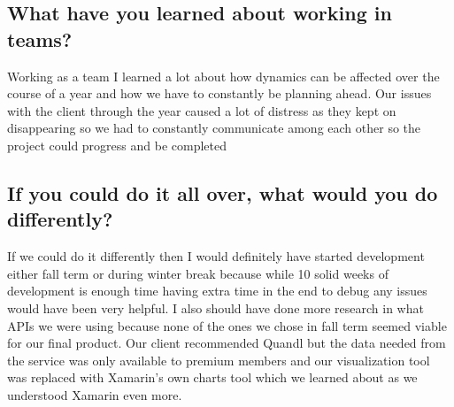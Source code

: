 \documentclass[onecolumn, draftclsnofoot,10pt, compsoc]{IEEEtran}
\begin{document}
    \subsection{What have you learned about working in teams?}
    Working as a team I learned a lot about how dynamics can be affected over the course of a year and how we have to constantly be planning ahead. Our issues with the client through the year caused a lot of distress as they kept on disappearing so we had to constantly communicate among each other so the project could progress and be completed 
    
    \subsection{If you could do it all over, what would you do differently?}
    If we could do it differently then I would definitely have started development either fall term or during winter break because while 10 solid weeks of development is enough time having extra time in the end to debug any issues would have been very helpful. I also should have done more research in what APIs we were using because none of the ones we chose in fall term seemed viable for our final product. Our client recommended Quandl but the data needed from the service was only available to premium members and our visualization tool was replaced with Xamarin’s own charts tool which we learned about as we understood Xamarin even more. 


    
\end{document}
